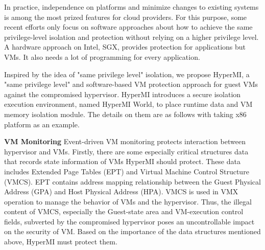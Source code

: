 \documentclass[conference]{IEEEtran}
\begin{document}
In practice, independence on platforms and minimize changes to existing systems is among the most prized features for cloud providers. For this purpose,
some recent efforts only focus on software approaches about how to achieve the same privilege-level isolation and protection without relying on a higher privilege level. 
 A hardware approach on Intel, SGX, provides protection for applications but VMs. It also needs a lot of programming for every application.



Inspired by the idea of "same privilege level" isolation, we propose HyperMI, a "same privilege level" and software-based VM protection approach for guest VMs against the compromised hypervisor. HyperMI introduces a secure isolation execution environment, named HyperMI World, to place runtime data and VM memory isolation module. 
The details on them are as follows with taking x86 platform as an example.

\textbf{VM Monitoring}
Event-driven VM monitoring protects interaction between hypervisor and VMs. 
Firstly, there are some especially critical structures data that records state information of VMs HyperMI should protect. These data includes Extended Page Tables (EPT) and Virtual Machine Control Structure (VMCS). EPT contains address mapping relationship between the Guest Physical Address (GPA) and Host Physical Address (HPA). 
VMCS is used in VMX operation to manage the behavior of VMs and the hypervisor. Thus, the illegal content of VMCS, especially the Guest-state area and VM-execution control fields, subverted by the compromised hypervisor poses an uncontrollable impact on the security of VM. 
Based on the importance of the data structures mentioned above, HyperMI must protect them. 
\end{document}
